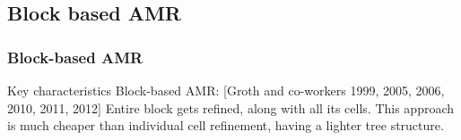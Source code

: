 \documentclass{beamer}
\begin{document}

\subsection{Block based AMR}
\begin{frame}%
\frametitle{Block-based AMR}
\tiny
\begin{minipage}[t][1\textheight]{1\textwidth}
\vspace{-15pt}
\begin{exampleblock}{Key characteristics}
Block-based AMR: [Groth and co-workers 1999, 2005, 2006, 2010, 2011, 2012] \newline
Entire block gets refined, along with all its cells. This approach is much cheaper than individual cell refinement, having a lighter tree structure.
\vspace{-20pt}
\begin{figure}
\label{fig:cubeAMRbased}
\centering
{}

\end{figure}
\end{exampleblock}
\end{minipage}
\end{frame}
\end{document}
